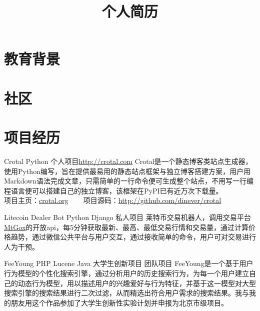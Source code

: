 \documentclass[11pt,a4paper]{moderncv}
\title{个人简历}                      %
\begin{document}
\maketitle

\section{教育背景}


\section{社区}

\section{项目经历}
\renewcommand{\baselinestretch}{1.2}

{Crotal}
{Python}
{个人项目}{\url{http://crotal.com}}
{Crotal是一个静态博客类站点生成器，使用Python编写，旨在提供最易用的静态站点框架与独立博客搭建方案，用户用Markdown语法完成文章，只需简单的一行命令便可生成整个站点，不用写一行编程语言便可以搭建自己的独立博客，该框架在PyPI已有近万次下载量。\\
项目主页：\href{http://crotal.org}{crotal.org} ~~~ 项目源码：\url{http://github.com/dinever/crotal}}

{Litecoin Dealer Bot}
{Python Django}
{私人项目}{}
{莱特币交易机器人，调用交易平台\href{http://MtGox.com}{MtGox}的开放api，每5分钟获取最新、最高、最低交易行情和交易量，通过计算价格趋势，通过微信公共平台与用户交互，通过接收简单的命令，用户可对交易进行人为干预。}

{FeeYoung}
{PHP Lucene Java}
{大学生创新项目 团队项目}{}
{FeeYoung是一个基于用户行为模型的个性化搜索引擎，通过分析用户的历史搜索行为，为每一个用户建立自己的动态行为模型，用以描述用户的兴趣爱好与行为特征，并基于这一模型对大型搜索引擎的搜索结果进行二次过滤，从而精选出符合用户需求的搜索结果。我与我的朋友用这个作品参加了大学生创新性实验计划并申报为北京市级项目。}
\end{document}
